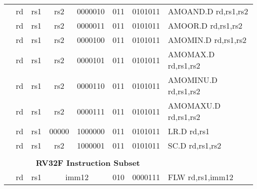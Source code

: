 \begin{table}[p]
\begin{small}
\begin{center}
\begin{tabular}{rccccccccccl}
&
\multicolumn{1}{|c|}{rd} &
\multicolumn{1}{c|}{rs1} &
\multicolumn{1}{c|}{rs2} &
\multicolumn{4}{c|}{0000010} &
\multicolumn{2}{c|}{011} &
\multicolumn{1}{c|}{0101011} & AMOAND.D rd,rs1,rs2 \\
\cline{2-11}
  

&
\multicolumn{1}{|c|}{rd} &
\multicolumn{1}{c|}{rs1} &
\multicolumn{1}{c|}{rs2} &
\multicolumn{4}{c|}{0000011} &
\multicolumn{2}{c|}{011} &
\multicolumn{1}{c|}{0101011} & AMOOR.D rd,rs1,rs2 \\
\cline{2-11}
  

&
\multicolumn{1}{|c|}{rd} &
\multicolumn{1}{c|}{rs1} &
\multicolumn{1}{c|}{rs2} &
\multicolumn{4}{c|}{0000100} &
\multicolumn{2}{c|}{011} &
\multicolumn{1}{c|}{0101011} & AMOMIN.D rd,rs1,rs2 \\
\cline{2-11}
  

&
\multicolumn{1}{|c|}{rd} &
\multicolumn{1}{c|}{rs1} &
\multicolumn{1}{c|}{rs2} &
\multicolumn{4}{c|}{0000101} &
\multicolumn{2}{c|}{011} &
\multicolumn{1}{c|}{0101011} & AMOMAX.D rd,rs1,rs2 \\
\cline{2-11}
  

&
\multicolumn{1}{|c|}{rd} &
\multicolumn{1}{c|}{rs1} &
\multicolumn{1}{c|}{rs2} &
\multicolumn{4}{c|}{0000110} &
\multicolumn{2}{c|}{011} &
\multicolumn{1}{c|}{0101011} & AMOMINU.D rd,rs1,rs2 \\
\cline{2-11}
  

&
\multicolumn{1}{|c|}{rd} &
\multicolumn{1}{c|}{rs1} &
\multicolumn{1}{c|}{rs2} &
\multicolumn{4}{c|}{0000111} &
\multicolumn{2}{c|}{011} &
\multicolumn{1}{c|}{0101011} & AMOMAXU.D rd,rs1,rs2 \\
\cline{2-11}
  

&
\multicolumn{1}{|c|}{rd} &
\multicolumn{1}{c|}{rs1} &
\multicolumn{1}{c|}{00000} &
\multicolumn{4}{c|}{1000000} &
\multicolumn{2}{c|}{011} &
\multicolumn{1}{c|}{0101011} & LR.D rd,rs1 \\
\cline{2-11}
  

&
\multicolumn{1}{|c|}{rd} &
\multicolumn{1}{c|}{rs1} &
\multicolumn{1}{c|}{rs2} &
\multicolumn{4}{c|}{1000001} &
\multicolumn{2}{c|}{011} &
\multicolumn{1}{c|}{0101011} & SC.D rd,rs1,rs2 \\
\cline{2-11}
  

&
\multicolumn{10}{c}{} & \\
&
\multicolumn{10}{c}{\bf RV32F Instruction Subset} & \\
\cline{2-11}
  

&
\multicolumn{1}{|c|}{rd} &
\multicolumn{1}{c|}{rs1} &
\multicolumn{5}{c|}{imm12} &
\multicolumn{2}{c|}{010} &
\multicolumn{1}{c|}{0000111} & FLW rd,rs1,imm12 \\
\cline{2-11}
  


\end{tabular}
\end{center}
\end{small}
\end{table}
